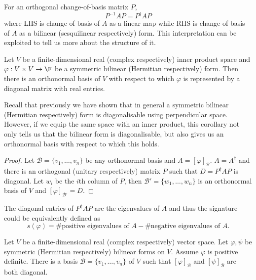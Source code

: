 \documentclass[a4paper]{article}
\newcommand*{\basis}{\mathcal}
\theoremstyle{definition}
\begin{document}
\begin{note}
  For an orthogonal change-of-basis matrix \(P\),
  \[
    P^{-1}AP = P^\dag AP
  \]
  where LHS is change-of-basis of \(A\) as a linear map while RHS is change-of-basis of \(A\) as a bilinear (sesquilinear respectively) form. This interpretation can be exploited to tell us more about the structure of it.
\end{note}

\begin{corollary}
  Let \(V\) be a finite-dimensional real (complex respectively) inner product space and \(\varphi: V \times V \to \F\) be a symmetric bilinear (Hermitian respectively) form. Then there is an orthonormal basis of \(V\) with respect to which \(\varphi\) is represented by  a diagonal matrix with real entries.
\end{corollary}

Recall that previously we have shown that in general a symmetric bilinear (Hermitian respectively) form is diagonalisable using perpendicular space. However, if we equip the same space with an inner product, this corollary not only tells us that the bilinear form is diagonalisable, but also gives us an orthonormal basis with respect to which this holds.

\begin{proof}
  Let \(\basis B = \{v_1, \dots, v_n\}\) be any orthonormal basis and \(A = [\varphi]_{\basis B}\). \(A = A^\dag\) and there is an orthogonal (unitary respectively) matrix \(P\) such that \(D = P^\dag AP\) is diagonal. Let \(w_i\) be the \(i\)th column of \(P\), then \(\basis B' = \{w_1, \dots, w_n\}\) is an orthonormal basis of \(V\) and \([\varphi]_{\basis B'} = D\).
\end{proof}

\begin{remark}
  The diagonal entries of \(P^\dag AP\) are the eigenvalues of \(A\) and thus the signature could be equivalently defined as
  \[
    s(\varphi) = \# \text{positive eigenvalues of } A - \# \text{negative eigenvalues of } A.
  \]
\end{remark}

\begin{corollary}
  Let \(V\) be a finite-dimensional real (complex respectively) vector space. Let \(\varphi, \psi\) be symmetric (Hermitian respectively) bilinear forms on \(V\). Assume \(\varphi\) is positive definite. There is a basis \(\basis B = \{v_1, \dots, v_n\}\) of \(V\) such that \([\varphi]_{\basis B}\) and \([\psi]_{\basis B}\) are both diagonal.
\end{corollary}
\end{document}
